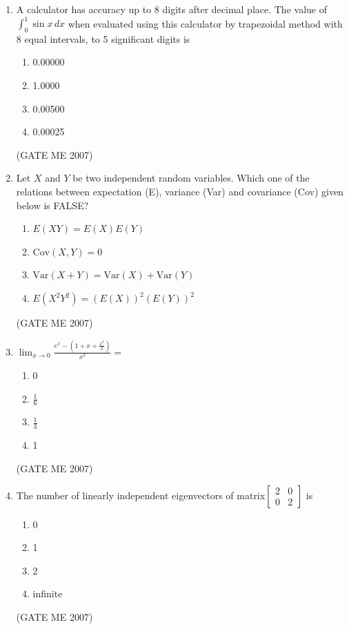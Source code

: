 \documentclass[journal]{IEEEtran}
\begin{document}
\begin{enumerate}
\item A calculator has accuracy up to 8 digits after decimal place. The value of \( \int_0^1 \sin x \, dx \) when evaluated using this calculator by trapezoidal method with 8 equal intervals, to 5 significant digits is
\begin{multicols}{4}
\begin{enumerate}
\item 0.00000
\item 1.0000
\item 0.00500
\item 0.00025
\end{enumerate}
\end{multicols}
\hfill (GATE ME 2007)

\item Let \( X \) and \( Y \) be two independent random variables. Which one of the relations between expectation (E), variance (Var) and covariance (Cov) given below is FALSE?
\begin{multicols}{2}
\begin{enumerate}
\item \( E(XY) = E(X)E(Y) \)
\item \( \text{Cov}(X,Y) = 0 \)
\item \( \text{Var}(X+Y) = \text{Var}(X) + \text{Var}(Y) \)
\item \( E(X^2Y^2) = (E(X))^2(E(Y))^2 \)
\end{enumerate}
\end{multicols}
\hfill (GATE ME 2007)

\item \(\lim_{x \to 0} \frac{e^x - \left(1 + x + \frac{x^2}{2}\right)}{x^3} =\)
\begin{multicols}{4}
\begin{enumerate}
\item 0
\item \( \frac{1}{6} \)
\item \( \frac{1}{3} \)
\item 1
\end{enumerate}
\end{multicols}
\hfill (GATE ME 2007)

\item The number of linearly independent eigenvectors of matrix\(\begin{bmatrix}
2 & 0 \\
0 & 2
\end{bmatrix}
\)
is
\begin{multicols}{4}
\begin{enumerate}
\item 0
\item 1
\item 2
\item infinite
\end{enumerate}
\end{multicols}
\hfill (GATE ME 2007)


\end{enumerate}
\end{document}
